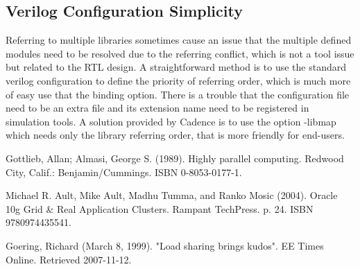 \documentclass[twoside]{article}
\begin{document}
\begin{multicols}{2}
  \subsection{Verilog Configuration Simplicity}

  Referring to multiple libraries sometimes cause an issue that the multiple defined modules need to be resolved due to the referring conflict, which is not a tool issue but related to the RTL design. A straightforward method is to use the standard verilog configuration to define the priority of referring order, which is much more of easy use that the binding option. There is a trouble that the configuration file need to be an extra file and its extension name need to be registered in simulation tools. A solution provided by Cadence is to use the option -libmap which needs only the library referring order, that is more friendly for end-users.


  \begin{thebibliography}{99} %

    Gottlieb, Allan; Almasi, George S. (1989).
    Highly parallel computing.
    Redwood City, Calif.: Benjamin/Cummings. ISBN 0-8053-0177-1.

    Michael R. Ault, Mike Ault, Madhu Tumma, and Ranko Mosic (2004).
    Oracle 10g Grid \& Real Application Clusters.
    Rampant TechPress. p. 24. ISBN 9780974435541.

    Goering, Richard (March 8, 1999).
    "Load sharing brings kudos".
    EE Times Online. Retrieved 2007-11-12.

  \end{thebibliography}


\end{multicols}
\end{document}
